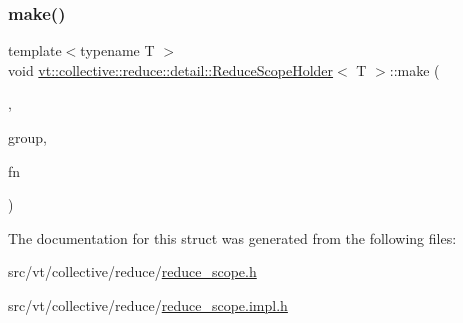 \mbox{\label{structvt_1_1collective_1_1reduce_1_1detail_1_1_reduce_scope_holder_a47ef025fc658370a2d42680f7c006abb}} 
\subsubsection{\texorpdfstring{make()}{make()}\hspace{0.1cm}{\footnotesize\ttfamily [2/2]}}
{\footnotesize\ttfamily template$<$typename T $>$ \\
void \hyperlink{structvt_1_1collective_1_1reduce_1_1detail_1_1_reduce_scope_holder}{vt\+::collective\+::reduce\+::detail\+::\+Reduce\+Scope\+Holder}$<$ T $>$\+::make (\begin{DoxyParamCaption}\item[{\hyperlink{structvt_1_1collective_1_1reduce_1_1detail_1_1_reduce_scope_holder_1_1_group_tag}{Group\+Tag}}]{,  }\item[{\hyperlink{namespacevt_a27b5e4411c9b6140c49100e050e2f743}{Group\+Type}}]{group,  }\item[{\hyperlink{structvt_1_1collective_1_1reduce_1_1detail_1_1_reduce_scope_holder_ac1bca1874a023b11bdc3c26b165c3b20}{Default\+Create\+Function}}]{fn }\end{DoxyParamCaption})}



The documentation for this struct was generated from the following files\+:\begin{DoxyCompactItemize}
\item 
src/vt/collective/reduce/\hyperlink{reduce__scope_8h}{reduce\+\_\+scope.\+h}\item 
src/vt/collective/reduce/\hyperlink{reduce__scope_8impl_8h}{reduce\+\_\+scope.\+impl.\+h}\end{DoxyCompactItemize}
